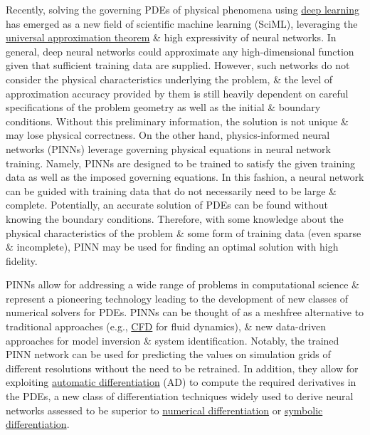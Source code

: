 \documentclass{article}
\begin{document}
Recently, solving the governing PDEs of physical phenomena using \href{https://en.wikipedia.org/wiki/Deep_learning}{deep learning} has emerged as a new field of scientific machine learning (SciML), leveraging the \href{https://en.wikipedia.org/wiki/Universal_approximation_theorem}{universal approximation theorem} \& high expressivity of neural networks. In general, deep neural networks could approximate any high-dimensional function given that sufficient training data are supplied. However, such networks do not consider the physical characteristics underlying the problem, \& the level of approximation accuracy provided by them is still heavily dependent on careful specifications of the problem geometry as well as the initial \& boundary conditions. Without this preliminary information, the solution is not unique \& may lose physical correctness. On the other hand, physics-informed neural networks (PINNs) leverage governing physical equations in neural network training. Namely, PINNs are designed to be trained to satisfy the given training data as well as the imposed governing equations. In this fashion, a neural network can be guided with training data that do not necessarily need to be large \& complete. Potentially, an accurate solution of PDEs can be found without knowing the boundary conditions. Therefore, with some knowledge about the physical characteristics of the problem \& some form of training data (even sparse \& incomplete), PINN may be used for finding an optimal solution with high fidelity.

PINNs allow for addressing a wide range of problems in computational science \& represent a pioneering technology leading to the development of new classes of numerical solvers for PDEs. PINNs can be thought of as a meshfree alternative to traditional approaches (e.g., \href{https://en.wikipedia.org/wiki/Computational_Fluid_Dynamics}{CFD} for fluid dynamics), \& new data-driven approaches for model inversion \& system identification. Notably, the trained PINN network can be used for predicting the values on simulation grids of different resolutions without the need to be retrained. In addition, they allow for exploiting \href{https://en.wikipedia.org/wiki/Automatic_differentiation}{automatic differentiation} (AD) to compute the required derivatives in the PDEs, a new class of differentiation techniques widely used to derive neural networks assessed to be superior to \href{https://en.wikipedia.org/wiki/Numerical_differentiation}{numerical differentiation} or \href{https://en.wikipedia.org/wiki/Symbolic_differentiation}{symbolic differentiation}.
\end{document}
